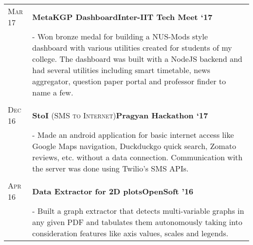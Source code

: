 \documentclass[a4paper,10pt]{extarticle} %
\begin{document}
{\begin{tabularx}{\linewidth}{ l | X }

\textsc{Mar 17} & \textbf{MetaKGP Dashboard}\hfill\textbf{Inter-IIT Tech Meet `17}\\
& {- Won bronze medal for building a NUS-Mods style dashboard with various utilities created for students of my college. The dashboard was built with a NodeJS backend and had several utilities including smart timetable, news aggregator, question paper portal and professor finder to name a few.}\\
\multicolumn{2}{c}{} \\

\textsc{Dec 16} & \textbf{StoI} \textsc{(SMS to Internet)}\hfill\textbf{Pragyan Hackathon `17}\\
& {- Made an android application for basic internet access like Google Maps navigation, Duckduckgo quick search, Zomato reviews, etc. without a data connection. Communication with the server was done using Twilio's SMS APIs.}\\
\multicolumn{2}{c}{} \\

\textsc{Apr 16} & \textbf{Data Extractor for 2D plots}\hfill\textbf{OpenSoft '16}\\
& {- Built a graph extractor that detects multi-variable graphs in any given PDF and tabulates them autonomously taking into consideration features like axis values, scales and legends.}\\



\end{tabularx}}
\end{document}
